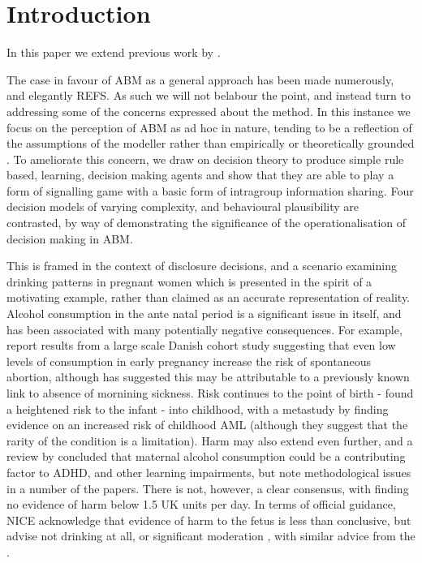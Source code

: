 \section{Introduction}
\label{sec:intro}

In this paper we extend previous work by \cite{GrayDissert}.

The case in favour of \ac{ABM} as a general approach has been made numerously, and elegantly REFS. As such we will not belabour the point, and instead turn to addressing some of the concerns expressed about the method. In this instance we focus on the perception of \ac{ABM} as ad hoc in nature, tending to be a reflection of the assumptions of the modeller rather than empirically or theoretically grounded \citep{Waldherr2013}. To ameliorate this concern, we draw on decision theory to produce simple rule based, learning, decision making agents and show that they are able to play a form of signalling game \citep{Kreps1987} with a basic form of intragroup information sharing. Four decision models of varying complexity, and behavioural plausibility are contrasted, by way of demonstrating the significance of the operationalisation of decision making in \ac{ABM}.

This is framed in the context of disclosure decisions, and a scenario examining drinking patterns in pregnant women which is presented in the spirit of a motivating example, rather than claimed as an accurate representation of reality. Alcohol consumption in the ante natal period is a significant issue in itself, and has been associated with many potentially negative consequences. For example, \citet{Andersen2012} report results from a large scale Danish cohort study suggesting that even low levels of consumption in early pregnancy increase the risk of spontaneous abortion, although \citet{Savitz2012} has suggested this may be attributable to a previously known link to absence of mornining sickness. Risk continues to the point of birth - \citet{Kesmodel2002} found a heightened risk to the infant - into childhood, with a metastudy by \citet{Latino-Martel2010} finding evidence on an increased risk of childhood \ac{AML} (although they suggest that the rarity of the condition is a limitation). Harm may also extend even further, and a review by \citet{Huizink2006} concluded that maternal alcohol consumption could be a contributing factor to \ac{ADHD}, and other learning impairments, but note methodological issues in a number of the papers. There is not, however, a clear consensus, with \citet{Gray2006} finding no evidence of harm below 1.5 UK units per day. In terms of official guidance, \ac{NICE} acknowledge that evidence of harm to the fetus is less than conclusive, but advise not drinking at all, or significant moderation \citep{NICE2010a}, with similar advice from the \cite{DepartmentofHealth2008}.

